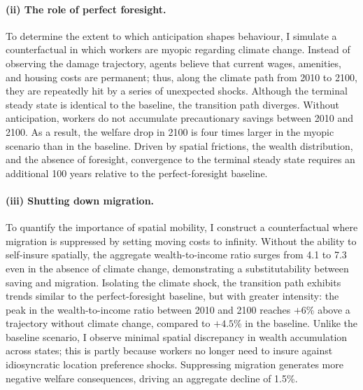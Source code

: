 \documentclass[12pt, a4paper]{article}
\begin{document}
\paragraph{(ii) The role of perfect foresight.} To determine the extent to which anticipation shapes behaviour, I simulate a counterfactual in which workers are myopic regarding climate change. Instead of observing the damage trajectory, agents believe that current wages, amenities, and housing costs are permanent; thus, along the climate path from 2010 to 2100, they are repeatedly hit by a series of unexpected shocks. Although the terminal steady state is identical to the baseline, the transition path diverges. Without anticipation, workers do not accumulate precautionary savings between 2010 and 2100. As a result, the welfare drop in 2100 is four times larger in the myopic scenario than in the baseline. Driven by spatial frictions, the wealth distribution, and the absence of foresight, convergence to the terminal steady state requires an additional 100 years relative to the perfect-foresight baseline.

\paragraph{(iii) Shutting down migration.} To quantify the importance of spatial mobility, I construct a counterfactual where migration is suppressed by setting moving costs to infinity. Without the ability to self-insure spatially, the aggregate wealth-to-income ratio surges from 4.1 to 7.3 even in the absence of climate change, demonstrating a substitutability between saving and migration. Isolating the climate shock, the transition path exhibits trends similar to the perfect-foresight baseline, but with greater intensity: the peak in the wealth-to-income ratio between 2010 and 2100 reaches $+6$\% above a trajectory without climate change, compared to $+4.5$\% in the baseline. Unlike the baseline scenario, I observe minimal spatial discrepancy in wealth accumulation across states; this is partly because workers no longer need to insure against idiosyncratic location preference shocks. Suppressing migration generates more negative welfare consequences, driving an aggregate decline of 1.5\%.
\end{document}
